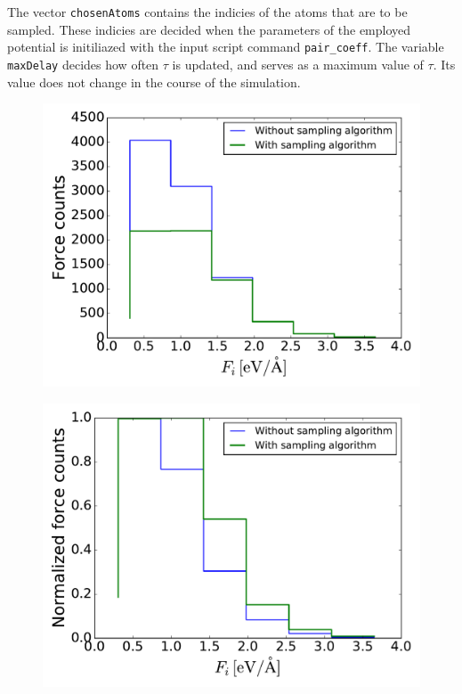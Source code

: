 \documentclass[twoside,english]{uiofysmaster}
\begin{document}
The vector \texttt{chosenAtoms} contains the indicies of the atoms that are to be sampled. These indicies are decided
when the parameters of the employed potential is initiliazed with the input script command \texttt{pair\_coeff}. 
The variable \texttt{maxDelay} decides how often $\tau$ is updated, and serves as a maximum value of $\tau$. 
Its value does not change in the course of the simulation. 
\begin{figure}
\begin{minipage}{0.48\linewidth}
  \subcaption{}
  \includegraphics[width=\textwidth]{Figures/Implementation/forceDistSamplingAlgo.pdf}
  \label{fig:forceDistSamplingAlgo:a}
\end{minipage}
\quad
\begin{minipage}{0.48\linewidth}
\subcaption{}
\includegraphics[width=\textwidth]{Figures/Implementation/forceDistSamplingAlgoNormed.pdf}

\end{minipage}
\end{figure}
\end{document}
